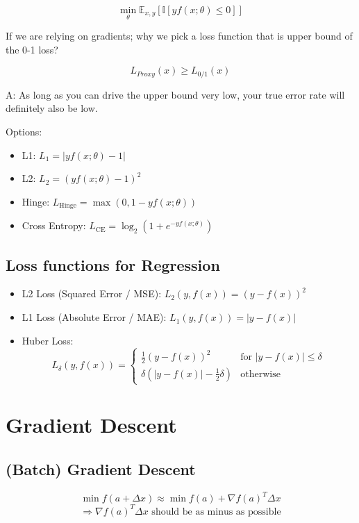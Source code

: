 \documentclass[12pt,a4paper]{article}
\begin{document}
\[\min_{\theta} \mathbb{E}_{x,y} [ \mathbb{I}[yf(x;\theta) \le 0] ]\]

If we are relying on gradients; why we pick a loss function that is upper bound of the 0-1 loss?

\[L_{Proxy}(x) \ge L_{0/1}(x)\]

A: As long as you can drive the upper bound very low, your true error rate will definitely also be low.

Options:

\begin{itemize}
    \item L1: $L_1 = |yf(x; \theta) - 1|$
    \item L2: $L_2 = (yf(x; \theta) - 1)^2$
    \item Hinge: $L_{\text{Hinge}} = \max(0, 1 - yf(x; \theta))$
    \item Cross Entropy: $L_{\text{CE}} = \log_2(1 + e^{-yf(x; \theta)})$
\end{itemize}

\subsection*{Loss functions for Regression}

\begin{itemize}
    \item L2 Loss (Squared Error / MSE): $L_2(y, f(x)) = (y - f(x))^2$
    \item L1 Loss (Absolute Error / MAE): $L_1(y, f(x)) = |y - f(x)|$
    \item Huber Loss: 
    \[L_{\delta}(y, f(x)) = \begin{cases}
    \frac{1}{2}(y - f(x))^2 & \text{for } |y - f(x)| \le \delta\\
    \delta(|y - f(x)| - \frac{1}{2}\delta) & \text{otherwise}
    \end{cases}\]
\end{itemize}

\section*{Gradient Descent}

\subsection*{(Batch) Gradient Descent}

\[\min f(a + \Delta x) \approx \min f(a) + \nabla f(a)^T \Delta x\]
\[\Rightarrow \nabla f(a)^T \Delta x\text{ should be as minus as possible}\]
\end{document}
